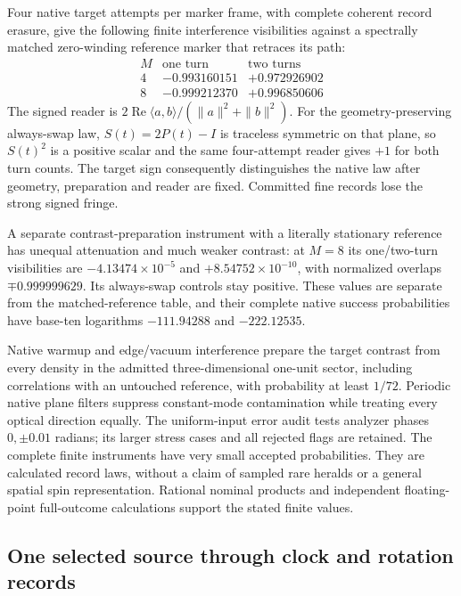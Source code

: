 Four native target attempts per marker frame, with complete coherent record
erasure, give the following finite interference visibilities against a
spectrally matched zero-winding reference marker that retraces its path:
\[
 \begin{array}{c|rr}
 M&\text{one turn}&\text{two turns}\\ \hline
 4&-0.993160151&+0.972926902\\
 8&-0.999212370&+0.996850606
 \end{array}
\]
The signed reader is $2\operatorname{Re}\langle a,b\rangle/
(\|a\|^2+\|b\|^2)$. For the geometry-preserving always-swap law,
$S(t)=2P(t)-I$ is traceless symmetric on that plane, so $S(t)^2$ is a
positive scalar and the same four-attempt reader gives $+1$ for both turn
counts. The target sign consequently distinguishes the native law after
geometry, preparation and reader are fixed. Committed fine records lose the
strong signed fringe.

A separate contrast-preparation instrument with a literally stationary
reference has unequal attenuation and much weaker
contrast: at $M=8$ its one/two-turn visibilities are
$-4.13474\times10^{-5}$ and $+8.54752\times10^{-10}$, with normalized
overlaps $\mp0.999999629$. Its always-swap controls stay positive. These
values are separate from the matched-reference table, and their complete
native success probabilities have base-ten logarithms $-111.94288$ and
$-222.12535$.

Native warmup and edge/vacuum interference prepare the target contrast from
every density in the admitted three-dimensional one-unit sector, including
correlations with an untouched reference, with probability at least $1/72$. Periodic native
plane filters suppress constant-mode contamination while treating every
optical direction equally. The uniform-input error audit tests analyzer
phases $0,\pm0.01$ radians; its larger stress cases and all rejected flags
are retained. The complete finite instruments have very small accepted
probabilities. They are calculated record laws, without a claim of sampled
rare heralds or a general spatial spin representation. Rational nominal
products and independent floating-point full-outcome calculations support
the stated finite values.

\subsection{One selected source through clock and rotation records}
\label{subsec:selected-source-clock-rotation-join}

